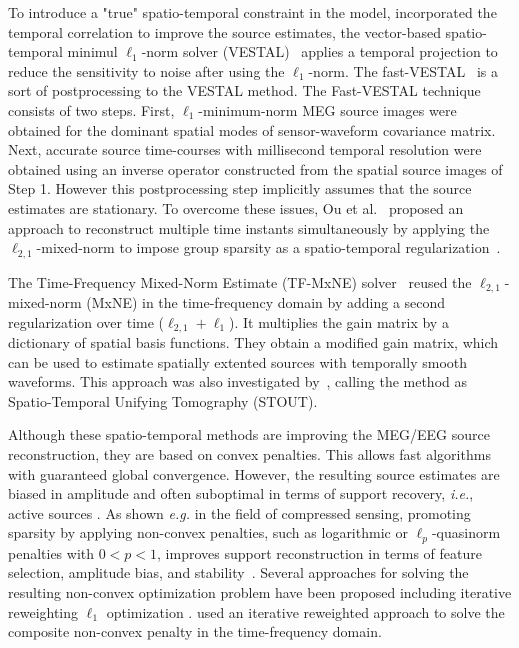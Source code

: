 To introduce a "true" spatio-temporal constraint in the model, \cite{zhang2011sparse,zhang2011iterative} incorporated the temporal correlation to improve the source estimates, the vector-based spatio-temporal minimul $\ell_1$-norm solver (VESTAL)~\cite{huang2006vector} applies a temporal projection to reduce the sensitivity to noise after using the $\ell_1$-norm. The fast-VESTAL~\cite{huang2014meg} is a sort of postprocessing to the VESTAL method. The Fast-VESTAL technique consists of two steps. First, $\ell_1$-minimum-norm MEG source images were obtained for the dominant spatial modes of sensor-waveform covariance matrix. Next, accurate source time-courses with millisecond temporal resolution were obtained using an inverse operator constructed from the spatial source images of Step 1. However this postprocessing step implicitly assumes that the source estimates are stationary. To overcome these issues, Ou et al.~\cite{Ou-etal:2009} proposed an approach to reconstruct multiple time instants simultaneously by applying the $\ell_{2,1}$-mixed-norm to impose group sparsity as a spatio-temporal regularization~\cite{gramfort2012mixed,Ou-etal:2009}.

The Time-Frequency Mixed-Norm Estimate (TF-MxNE) solver~\cite{gramfort2013time} reused the $\ell_{2,1}$-mixed-norm (MxNE) in the time-frequency domain by adding a second regularization over time ($\ell_{2,1} + \ell_1$). It multiplies the gain matrix by a dictionary of spatial basis functions. They obtain a modified gain matrix, which can be used to estimate spatially extented sources with temporally smooth waveforms. This approach was also investigated by~\cite{castano2015solving}, calling the method as Spatio-Temporal Unifying Tomography (STOUT).

Although these spatio-temporal methods are improving the MEG/EEG source reconstruction, they are based on convex penalties. This allows fast algorithms with guaranteed global convergence. However, the resulting source estimates are biased in amplitude and often suboptimal in terms of support recovery, \textit{i.e.}, active sources \cite{candes2008enhancing}. As shown \textit{e.g.} in the field of compressed sensing, promoting sparsity by applying non-convex penalties, such as logarithmic or  $\ell_p$-quasinorm penalties with $0<p<1$, improves support reconstruction in terms of feature selection, amplitude bias, and stability~\cite{candes2008enhancing,chartrand2007exact,saab2008stable}. Several approaches for solving the resulting non-convex optimization problem have been proposed including iterative reweighting $\ell_1$ optimization \cite{candes2008enhancing}. \cite{strohmeier2014iterative} used an iterative reweighted approach to solve the composite non-convex penalty in the time-frequency domain.

